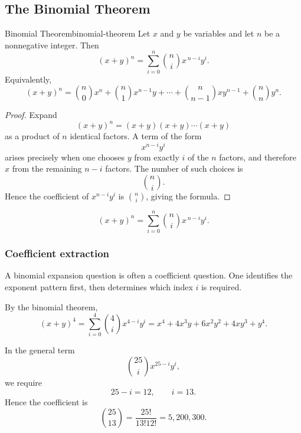 \subsection{The Binomial Theorem}

\begin{theorem}{Binomial Theorem}{binomial-theorem}
Let $x$ and $y$ be variables and let $n$ be a nonnegative integer. Then
\[
(x+y)^n
=
\sum_{i=0}^{n}\binom{n}{i}x^{\,n-i}y^i.
\]
Equivalently,
\[
(x+y)^n
=
\binom{n}{0}x^n+\binom{n}{1}x^{n-1}y+\cdots+\binom{n}{n-1}xy^{n-1}+\binom{n}{n}y^n.
\]
\end{theorem}

\begin{proof}
Expand
\[
(x+y)^n=(x+y)(x+y)\cdots(x+y)
\]
as a product of $n$ identical factors. A term of the form
\[
x^{n-i}y^i
\]
arises precisely when one chooses $y$ from exactly $i$ of the $n$ factors, and therefore $x$ from the remaining $n-i$ factors. The number of such choices is
\[
\binom{n}{i}.
\]
Hence the coefficient of $x^{n-i}y^i$ is $\binom{n}{i}$, giving the formula.
\end{proof}

\begin{keyformula}[title={Binomial theorem}]
\[
(x+y)^n=\sum_{i=0}^{n}\binom{n}{i}x^{\,n-i}y^i.
\]
\end{keyformula}

\subsubsection{Coefficient extraction}

A binomial expansion question is often a coefficient question. One identifies the exponent pattern first, then determines which index $i$ is required.

\begin{examplebox}[title={Expansion of $(x+y)^4$}]
By the binomial theorem,
\[
(x+y)^4
=
\sum_{i=0}^{4}\binom{4}{i}x^{4-i}y^i
=
x^4+4x^3y+6x^2y^2+4xy^3+y^4.
\]
\end{examplebox}

\begin{examplebox}[title={Coefficient of $x^{12}y^{13}$ in $(x+y)^{25}$}]
In the general term
\[
\binom{25}{i}x^{25-i}y^i,
\]
we require
\[
25-i=12,\qquad i=13.
\]
Hence the coefficient is
\[
\binom{25}{13}=\frac{25!}{13!12!}=5{,}200{,}300.
\]
\end{examplebox}

